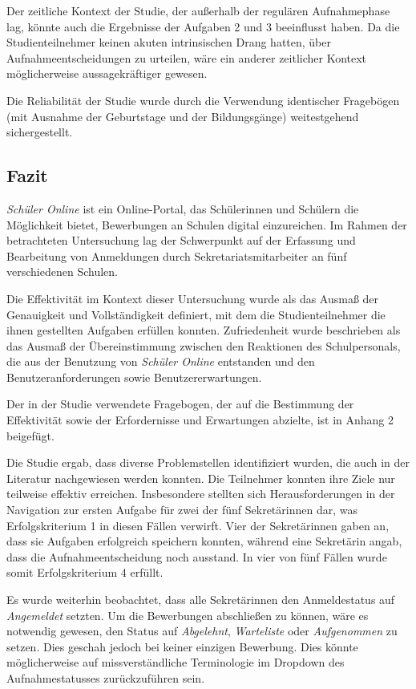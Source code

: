 Der zeitliche Kontext der Studie, der außerhalb der regulären Aufnahmephase lag, könnte auch die Ergebnisse der Aufgaben 2 und 3 beeinflusst haben. Da die Studienteilnehmer keinen akuten intrinsischen Drang hatten, über Aufnahmeentscheidungen zu urteilen, wäre ein anderer zeitlicher Kontext möglicherweise aussagekräftiger gewesen.

Die Reliabilität der Studie wurde durch die Verwendung identischer Fragebögen (mit Ausnahme der Geburtstage und der Bildungsgänge) weitestgehend sichergestellt.

\subsection{Fazit}

\textit{Schüler Online} ist ein Online-Portal, das Schülerinnen und Schülern die Möglichkeit bietet, Bewerbungen an Schulen digital einzureichen. Im Rahmen der betrachteten Untersuchung lag der Schwerpunkt auf der Erfassung und Bearbeitung von Anmeldungen durch Sekretariatsmitarbeiter an fünf verschiedenen Schulen.

Die Effektivität im Kontext dieser Untersuchung wurde als das Ausmaß der Genauigkeit und Vollständigkeit definiert, mit dem die Studienteilnehmer die ihnen gestellten Aufgaben erfüllen konnten. Zufriedenheit wurde beschrieben als das Ausmaß der Übereinstimmung zwischen den Reaktionen des Schulpersonals, die aus der Benutzung von \textit{Schüler Online} entstanden und den Benutzeranforderungen sowie Benutzererwartungen.

Der in der Studie verwendete Fragebogen, der auf die Bestimmung der Effektivität sowie der Erfordernisse und Erwartungen abzielte, ist in Anhang 2 beigefügt.

Die Studie ergab, dass diverse Problemstellen identifiziert wurden, die auch in der Literatur nachgewiesen werden konnten. Die Teilnehmer konnten ihre Ziele nur teilweise effektiv erreichen. Insbesondere stellten sich Herausforderungen in der Navigation zur ersten Aufgabe für zwei der fünf Sekretärinnen dar, was Erfolgskriterium 1 in diesen Fällen verwirft. Vier der Sekretärinnen gaben an, dass sie Aufgaben erfolgreich speichern konnten, während eine Sekretärin angab, dass die Aufnahmeentscheidung noch ausstand. In vier von fünf Fällen wurde somit Erfolgskriterium 4 erfüllt.

Es wurde weiterhin beobachtet, dass alle Sekretärinnen den Anmeldestatus auf \textit{Angemeldet} setzten. Um die Bewerbungen abschließen zu können, wäre es notwendig gewesen, den Status auf \textit{Abgelehnt}, \textit{Warteliste} oder \textit{Aufgenommen} zu setzen. Dies geschah jedoch bei keiner einzigen Bewerbung. Dies könnte möglicherweise auf missverständliche Terminologie im Dropdown des Aufnahmestatusses zurückzuführen sein. 

